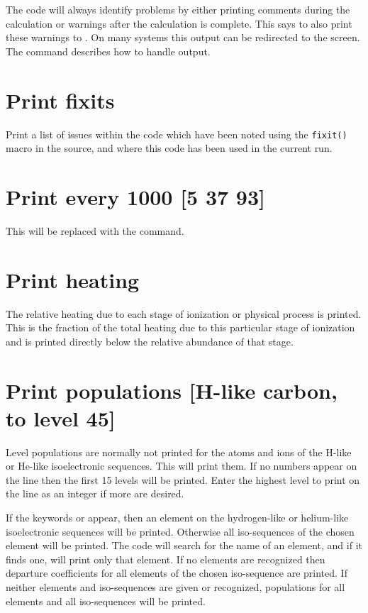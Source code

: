 The code will always identify problems by either printing comments during
the calculation or warnings after the calculation is complete.
This says
to also print these warnings to .
On many systems this output can
be redirected to the screen.
The  command describes how to handle
 output.

\section{Print fixits}

Print a list of issues within the code which have been noted using the
\verb|fixit()| macro in the source, and where this code has been used
in the current run.

\section{Print every 1000 [5 37 93]}

This will be replaced with the  command.

\section{Print heating}

The relative heating due to each stage of ionization or physical process
is printed.
This is the fraction of the total heating due to this particular
stage of ionization and is printed directly below the relative abundance
of that stage.

\section{Print populations  [H-like carbon, to level 45]}

Level populations are normally not printed for the atoms and ions of
the H-like or He-like isoelectronic sequences.
This will print them.
If
no numbers appear on the line then the first 15 levels will be printed.
Enter the highest level to print on the line as an integer if more are
desired.

If the keywords  or  appear,
then an element on the hydrogen-like or helium-like
isoelectronic sequences will be printed.
Otherwise all iso-sequences of the chosen element will be printed.
The code will search for the name of
an element, and if it finds one, will print only that element.
If no
elements are recognized then departure coefficients for all elements of the chosen
iso-sequence are printed.
If neither elements and iso-sequences are given or recognized, populations for
all elements and all iso-sequences will be printed.

